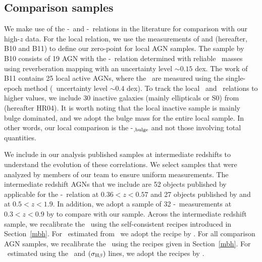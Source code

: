 \documentclass[apj]{emulateapj}
\begin{document}
\subsection{Comparison samples}\label{sec:compare_sample}

We make use of the \mbh-\lhost\ and \mbh-\smass\ relations in the literature for comparison with our high-$z$ data. For the local relation, we use the measurements of \citet{Ben++10} and \citet{Bennert++2011} (hereafter, B10 and B11) to define our zero-point for local AGN samples. The sample by B10 consists of 19 AGN with the \mbh-\lhost\ relation determined with reliable \mbh\ masses using reverberation mapping with an uncertainty level $\sim0.15$ dex. The work of B11 contains 25 local active AGNs, where the \mbh\ are measured using the single-epoch method (\mbh\ uncertainty level $\sim0.4$ dex). To track the local \smass\ and \mbh\  relations to higher values, we include 30 inactive galaxies (mainly ellipticals or S0) from \citet{H+R04} (hereafter HR04). It is worth noting that the local inactive sample is mainly bulge dominated, and we adopt the bulge mass for the entire local sample. In other words, our local comparison is the \mbh-\smass$_{\rm ,bulge}$ and not those involving total quantities.

We include in our analysis published samples at intermediate redshifts to understand the evolution of these correlations. We select samples that were analyzed by members of our team to ensure uniform measurements. The intermediate redshift AGNs that we include are 52 objects published by \citet{Park15} applicable for the \mbh-\lhost\ relation at $0.36<z<0.57$ and 27 objects published by \citet{Bennert11} and \citet{SS13} at $0.5<z<1.9$. In addition, we adopt a sample of 32 \mbh-\smass\ measurements at $0.3<z<0.9$ by \citet{Cisternas2011} to compare with our sample. Across the intermediate redshift sample, we recalibrate the \mbh\ using the self-consistent recipes introduced in Section~\ref{mbh}. For \mbh\ estimated from \Mgii\, we adopt the recipe by \citet{Ding2017b}. For all comparison AGN samples, we recalibrate the \mbh\ using the recipes given in Section~\ref{mbh}. For \mbh\ estimated using the \Mgii\ and  \hbeta$(\sigma_{\rm H\beta})$ lines, we adopt the recipes by \citet{Ding2017b}.
\end{document}
